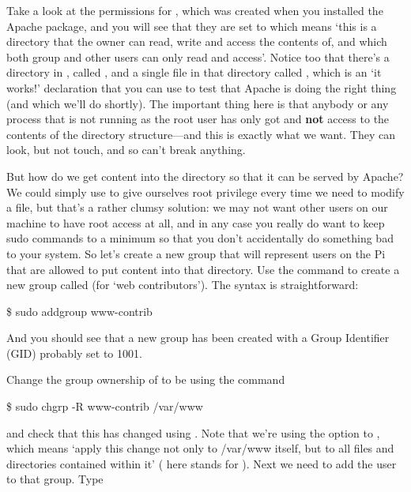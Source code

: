 Take a look at the permissions for , which was created
when you installed the Apache package, and you will see that they are
set to  which means `this is a directory that the
owner can read, write and access the contents of, and which both group
and other users can only read and access'. Notice too that there's
a directory in , called , and a
single file in that directory called , which is an
`it works!' declaration that you can use to test that Apache is doing
the right thing (and which we'll do shortly). The important thing here
is that anybody or any process that is not running as the root user
has only got  and \textbf{not}  access to
the contents of the  directory structure---and this is
exactly what we want. They can look, but not touch, and so can't break
anything.

But how do we get content into the  directory so that
it can be served by Apache? We could simply use  to give
ourselves root privilege every time we need to modify a file, but
that's a rather clumsy solution: we may not want other users on our
machine to have root access at all, and in any case you really do want
to keep sudo commands to a minimum so that you don't accidentally do
something bad to your system. So let's create a new group that will
represent users on the Pi that are allowed to put content into that
directory. Use the command  to create a new
group called  (for `web contributors'). The syntax
is straightforward:

\begin{ttoutenv}
\$ sudo addgroup www-contrib
\end{ttoutenv}

And you should see that a new group has been created with a Group
Identifier (GID) probably set to 1001.

Change the group ownership of  to be
 using the command

\begin{ttoutenv}
\$ sudo chgrp -R www-contrib /var/www
\end{ttoutenv}

and check that this has changed using . Note that we're
using the  option to , which means `apply
this change not only to /var/www itself, but to all files and
directories contained within it' ( here stands for
). Next we need to add the 
user to that group. Type

